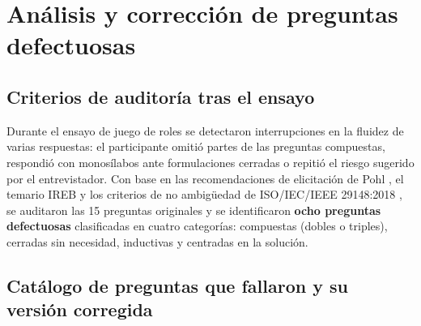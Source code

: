 \section{An\'alisis y correcci\'on de preguntas defectuosas}

\subsection{Criterios de auditor\'ia tras el ensayo}
Durante el ensayo de juego de roles se detectaron interrupciones en la fluidez de varias respuestas: el participante omiti\'o partes de las preguntas compuestas, respondi\'o con monos\'ilabos ante formulaciones cerradas o repiti\'o el riesgo sugerido por el entrevistador. Con base en las recomendaciones de elicitaci\'on de Pohl \cite{pohl2025}, el temario IREB \cite{ireb2026} y los criterios de no ambig\"uedad de ISO/IEC/IEEE 29148:2018 \cite{iso29148}, se auditaron las 15 preguntas originales y se identificaron \textbf{ocho preguntas defectuosas} clasificadas en cuatro categor\'ias: compuestas (dobles o triples), cerradas sin necesidad, inductivas y centradas en la soluci\'on.

\subsection{Cat\'alogo de preguntas que fallaron y su versi\'on corregida}

